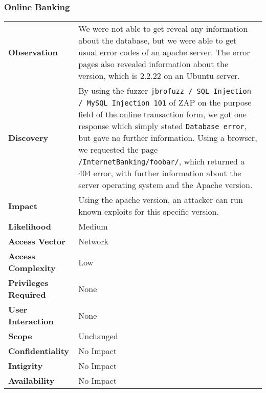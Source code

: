 \subsubsection*{Online Banking}
\begin{tabular}{l|p{10cm}}

\textbf{Observation} & We were not able to get reveal any information about the database, but we were able to get usual error codes of an apache server. The error pages also revealed information about the version, which is 2.2.22 on an Ubuntu server. \\
\textbf{Discovery} & By using the fuzzer \texttt{jbrofuzz / SQL Injection / MySQL Injection 101} of ZAP on the purpose field of the online transaction form, we got one response which simply stated \texttt{Database error}, but gave no further information. Using a browser, we requested the page \texttt{/InternetBanking/foobar/}, which returned a 404 error, with further information about the server operating system and the Apache version. \\
\textbf{Impact} & Using the apache version, an attacker can run known exploits for this specific version. \\
\textbf{Likelihood} & Medium \\
\textbf{Access Vector} & Network \\
\textbf{Access Complexity} & Low \\
\textbf{Privileges Required} & None \\
\textbf{User Interaction} & None \\
\textbf{Scope} & Unchanged \\
\textbf{Confidentiality} & No Impact \\
\textbf{Intigrity} & No Impact \\
\textbf{Availability} & No Impact \\
\end{tabular}

